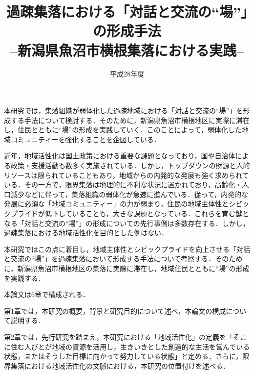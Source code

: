 \documentclass[a4paper]{jsarticle}
\begin{document}
 \masterthesis


\title{過疎集落における「対話と交流の“場”｣の形成手法\\
–新潟県魚沼市横根集落における実践–
}
\date{平成28年度}
\maketitle


\setcounter{page}{1} %
\par
本研究では，集落組織が弱体化した過疎地域における「対話と交流の“場”」を形成する手法について検討する．そのために，新潟県魚沼市横根地区に実際に滞在し，住民とともに“場”の形成を実践していく．このことによって，弱体化した地域コミュニティーを強化することを企図している．\par
近年，地域活性化は国土政策における重要な課題となっており，国や自治体による政策・支援活動も数多く実施されている．しかし，トップダウンの財源と人的リソースは限られていることもあり，地域からの内発的な発展も強く求められている．その一方で，限界集落は地理的に不利な状況に置かれており，高齢化・人口減少などに伴って，集落組織の弱体化が急速に進んでいる．従って，内発的な発展に必須な「地域コミュニティー」の力が弱まり，住民の地域主体性とシビックプライドが低下していることも，大きな課題となっている．これらを育む鍵となる「対話と交流の“場”」の形成についての先行事例は多数存在する．しかし，過疎集落における地域活性化を目的とした例はない．\par
本研究ではこの点に着目し，地域主体性とシビックプライドを向上させる「対話と交流の“場”」を過疎集落において形成する手法について考察する．そのために，新潟県魚沼市横根地区の集落に実際に滞在し，地域住民とともに“場”の形成を実践する．\par
本論文は6章で構成される．\par
第1章では，本研究の概要，背景と研究目的について述べ，本論文の構成について説明する．\par
第2章では，先行研究を踏まえ，本研究における「地域活性化」の定義を「そこに住む人びとが地域の資源を活用し，生きいきとした創造的な生活を営んでいる状態，またはそうした目標に向かって努力している状態」と定める．さらに，限界集落における地域活性化の文脈における，本研究の位置付けを述べる．\par
\end{document}
